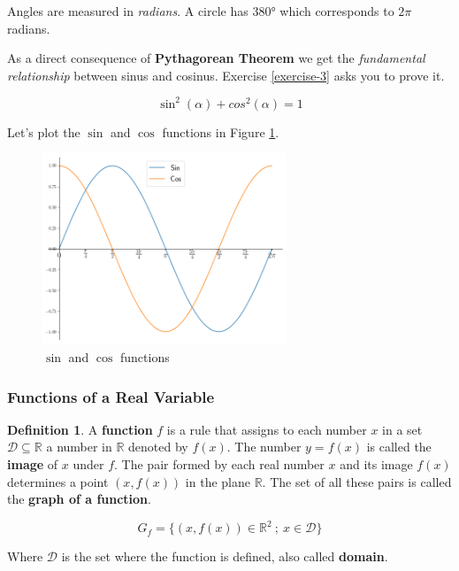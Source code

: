 \documentclass[a4paper,11pt]{article}
\theoremstyle{definition}
\newtheorem{definition}{Definition}
\theoremstyle{plain}
\begin{document}
    Angles are measured in \emph{radians}. A circle has \ang{380} which
corresponds to \(2\pi\) radians.

As a direct consequence of \textbf{Pythagorean Theorem} we get the
\emph{fundamental relationship} between sinus and cosinus. Exercise \ref{exercise-3} asks you to prove it.

\[
\sin^2(\alpha) + cos^2(\alpha) = 1
\]

Let's plot the \(\sin\) and \(\cos\) functions in Figure \ref{fig:sin_cos}.

    \begin{figure}[htbp]
    	\centering 
    		\includegraphics[width = 0.65\textwidth]{Ch1_files/Ch1_12_0.png}
    		\caption{$\sin$ and $\cos$ functions}
    		\label{fig:sin_cos}
    \end{figure}
    
    \subsubsection{Functions of a Real
Variable}\label{functions-of-a-real-variable}

\begin{definition} 
A \textbf{function} \(f\) is a rule that assigns to
each number \(x\) in a set \(\mathcal{D}\subseteq\mathbb{R}\) a number
in \(\mathbb{R}\) denoted by \(f(x)\). The number \(y = f(x)\) is called
the \textbf{image} of \(x\) under \(f\). The pair formed by each real
number \(x\) and its image \(f(x)\) determines a point \((x, f(x))\) in
the plane \(\mathbb{R}\). The set of all these pairs is called the
\textbf{graph of a function}.

\[
G_f = \{(x,f(x))\in\mathbb{R}^2 \ ; \ x\in \mathcal{D}\}
\]

Where \(\mathcal{D}\) is the set where the function is defined, also
called \textbf{domain}.
\end{definition}
\end{document}
